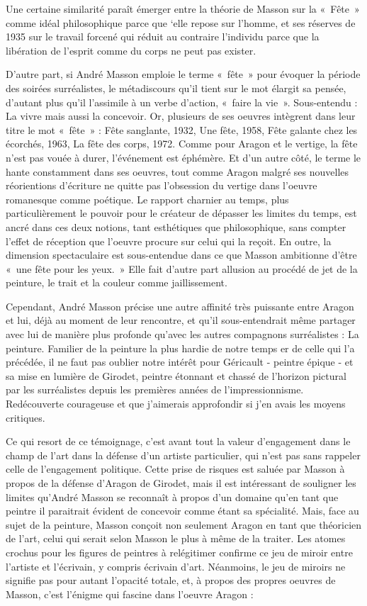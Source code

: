 	Une  certaine similarité paraît émerger entre la théorie de Masson sur la « Fête » comme idéal philosophique parce que ‘elle repose sur l’homme, et ses réserves de 1935 sur le travail forcené qui réduit au contraire l’individu parce que la libération de l’esprit comme du corps ne peut pas exister. 

	D’autre part, si André Masson emploie le terme « fête » pour évoquer la période des soirées surréalistes, le métadiscours qu’il tient sur le mot élargit sa pensée, d’autant plus qu’il l’assimile à un verbe d’action, « faire la vie ».  Sous-entendu : La vivre mais aussi la concevoir. Or, plusieurs de ses oeuvres intègrent dans leur titre le mot « fête » : Fête sanglante, 1932, Une fête, 1958, Fête galante chez les écorchés, 1963, La fête des corps, 1972. Comme pour Aragon et le vertige, la fête n’est pas vouée à durer, l’événement est éphémère. Et d’un autre côté, le terme le hante constamment dans ses oeuvres, tout comme Aragon malgré ses nouvelles réorientions d’écriture ne quitte pas l’obsession du vertige dans l’oeuvre romanesque comme poétique. Le rapport charnier au temps, plus particulièrement le pouvoir pour le créateur de dépasser les limites du temps, est ancré dans ces deux notions, tant esthétiques que philosophique, sans compter l’effet de réception que l’oeuvre procure sur celui qui la reçoit. En outre, la dimension spectaculaire est sous-entendue dans ce que Masson ambitionne d’être « une fête pour les yeux. » Elle fait d’autre part allusion au procédé de jet de la peinture, le trait et la couleur comme jaillissement. 

	Cependant, André Masson précise une autre affinité très puissante entre Aragon et lui, déjà au moment de leur rencontre, et qu’il sous-entendrait même partager avec lui de manière plus profonde qu’avec les autres compagnons surréalistes : La peinture. 
	Familier de la peinture la plus hardie de notre temps er de celle qui l’a précédée, il ne faut pas oublier notre intérêt pour Géricault - peintre épique - et sa mise en lumière de Girodet, peintre étonnant et chassé de l’horizon pictural par les surréalistes depuis les premières années de l’impressionnisme. Redécouverte  courageuse et que j’aimerais approfondir si j’en avais les moyens critiques.
	
	Ce qui resort de ce témoignage, c’est avant tout la valeur d’engagement dans le champ de l’art dans la défense d’un artiste particulier, qui n’est pas sans rappeler celle de l’engagement politique. Cette prise de risques est saluée par Masson à propos de la défense d’Aragon de Girodet, mais il est intéressant de souligner les limites qu’André Masson se reconnaît à propos d’un domaine qu’en tant que peintre il paraitrait évident de concevoir comme étant sa spécialité. Mais, face au sujet de la peinture, Masson conçoit non seulement Aragon en tant que théoricien de l’art, celui qui serait selon Masson le plus à même de la traiter. Les atomes crochus pour les figures de peintres à relégitimer confirme ce jeu de miroir entre l’artiste et l’écrivain, y compris écrivain d’art. Néanmoins, le jeu de miroirs ne signifie pas pour autant l’opacité totale, et, à propos des propres oeuvres de Masson, c’est l’énigme qui fascine dans l’oeuvre Aragon :

